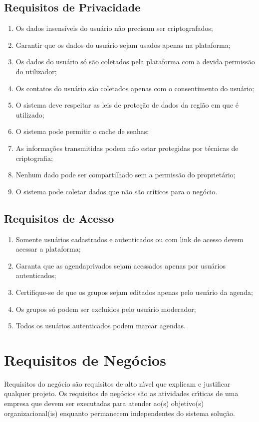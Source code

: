 \subsection{Requisitos de Privacidade }
\begin{enumerate}
  \item Os dados insensíveis do usuário não precisam ser criptografados;
  \item Garantir que os dados do usuário sejam usados apenas na plataforma;
  \item Os dados do usuário só são coletados pela plataforma com a devida permissão do utilizador;
  \item Os contatos do usuário são coletados apenas com o consentimento do usuário;
  \item O sistema deve respeitar as leis de proteção de dados da região em que é utilizado;
  \item O sistema pode permitir o cache de senhas;
  \item As informações transmitidas podem não estar protegidas por técnicas de criptografia;
  \item Nenhum dado pode ser compartilhado sem a permissão do proprietário;
  \item O sistema pode coletar dados que não são críticos para o negócio.
\end{enumerate}


\subsection{Requisitos de Acesso }
\begin{enumerate}
  \item Somente usuários cadastrados e autenticados ou com link de acesso devem acessar a plataforma;
  \item Garanta que as agendaprivados sejam acessados apenas por usuários autenticados;
  \item Certifique-se de que os grupos sejam editados apenas pelo usuário da agenda;
  \item Os grupos só podem ser excluídos pelo usuário moderador;
  \item Todos os usuários autenticados podem marcar agendas.
\end{enumerate}


\section{Requisitos de Neg\'{o}cios}
Requisitos do neg\'{o}cio s\~{a}o requisitos de alto n\'{\i}vel que explicam e justificar qualquer projeto. Os requisitos de neg\'{o}cios s\~{a}o as atividades cr\'{\i}ticas de uma empresa que devem ser executadas para atender ao(s) objetivo(s) organizacional(is) enquanto permanecem independentes do sistema solu\c{c}\~{a}o.


